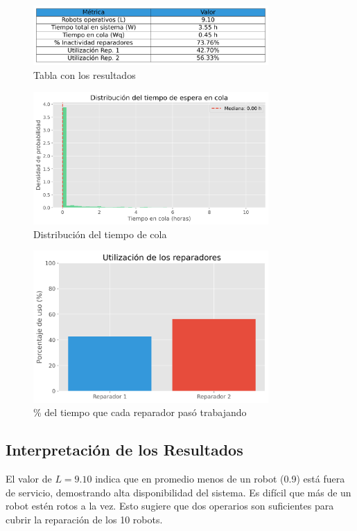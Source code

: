 \documentclass[12pt, a4paper]{article}
\begin{document}
\begin{figure}[h!]
    \centering
    \includegraphics[width=0.8\textwidth]{../img/tabla_resultados.png}
    \caption{Tabla con los resultados}
    \label{fig:ejemplo}
\end{figure}

\begin{figure}[h!]
    \centering
    \includegraphics[width=0.8\textwidth]{../img/distribucion_cola.png}
    \caption{Distribución del tiempo de cola}
    \label{fig:ejemplo}
\end{figure}

\begin{figure}[h!]
    \centering
    \includegraphics[width=0.8\textwidth]{../img/utilizacion_reparadores.png}
    \caption{\% del tiempo que cada reparador pasó trabajando}
    \label{fig:ejemplo}
\end{figure}

\subsection{Interpretación de los Resultados}
El valor de $L = 9.10$ indica que en promedio menos de un robot (0.9) está fuera de servicio, demostrando alta disponibilidad del sistema. Es difícil que más de un robot estén rotos a la vez. Esto sugiere que dos operarios son suficientes para cubrir la reparación de los 10 robots.
\end{document}
